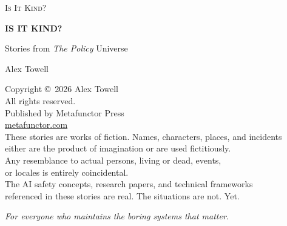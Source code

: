 \documentclass[11pt]{book}
\begin{document}
\frontmatter
\pagestyle{empty}

\begin{titlepage}
\centering
\vspace*{3in}
{\Large\scshape Is It Kind?\par}
\vfill
\end{titlepage}

\begin{titlepage}
\centering
\vspace*{1.5in}
{\Huge\bfseries IS IT KIND?\par}
\vspace{0.5in}
{\large Stories from \textit{The Policy} Universe\par}
\vspace{2in}
{\Large Alex Towell\par}
\vfill
\end{titlepage}

\clearpage
\thispagestyle{empty}
\vspace*{\fill}
\begin{center}
\small
Copyright \copyright\ 2026 Alex Towell\\
All rights reserved.\\
\vspace{0.3in}
Published by Metafunctor Press\\
\href{https://metafunctor.com}{metafunctor.com}\\
\vspace{0.3in}
These stories are works of fiction. Names, characters, places, and incidents\\
either are the product of imagination or are used fictitiously.\\
Any resemblance to actual persons, living or dead, events,\\
or locales is entirely coincidental.\\
\vspace{0.3in}
The AI safety concepts, research papers, and technical frameworks\\
referenced in these stories are real. The situations are not. Yet.\\
\end{center}
\vspace*{\fill}
\clearpage

\clearpage
\thispagestyle{empty}
\vspace*{2in}
\begin{center}
\textit{For everyone who maintains the boring systems that matter.}
\end{center}
\clearpage
\end{document}
